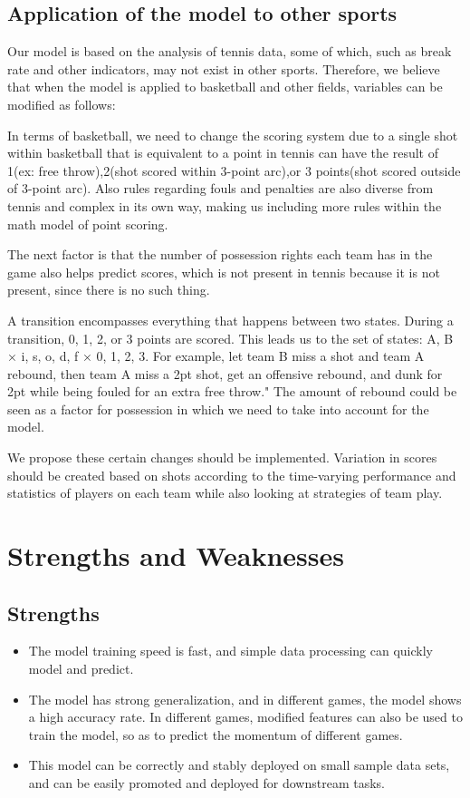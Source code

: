 \documentclass{mcmthesis}  %
\begin{document}
\subsection{Application of the model to other sports}  %
\hspace{1.5em}Our model is based on the analysis of tennis data, some of which, such as break rate and other indicators, may not exist in other sports. Therefore, we believe that when the model is applied to basketball and other fields, variables can be modified as follows:
\par In terms of basketball, we need to change the scoring system due to a single shot within basketball that is equivalent to a point in tennis can have the result of 1(ex: free throw),2(shot scored within 3-point arc),or 3 points(shot scored outside of 3-point arc). Also rules regarding fouls and penalties are also diverse from tennis and complex in its own way, making us including more rules within the math model of point scoring. 
\par The next factor is that the number of possession rights each team has in the game also helps predict scores, which is not present in tennis because it is not present, since there is no such thing.
\par A transition encompasses everything that happens between two states. During a transition, 0, 1, 2, or 3 points are scored. This leads us to the set of states: {A, B} × {i, s, o, d, f} × {0, 1, 2, 3}. For example, let team B miss a shot and team A rebound, then team A miss a 2pt shot, get an offensive rebound, and dunk for 2pt while being fouled for an extra free throw." The amount of rebound could be seen as a factor for possession in which we need to take into account for the model.
\par We propose these certain changes should be implemented. Variation in scores should be created based on shots according to the time-varying performance and statistics of players on each team while also looking at strategies of team play. \cite{1017285434.nh}

\section{Strengths and Weaknesses}  %
\subsection{Strengths}
\begin{itemize}
\item{The model training speed is fast, and simple data processing can quickly model and predict.}
\item{The model has strong generalization, and in different games, the model shows a high accuracy rate. In different games, modified features can also be used to train the model, so as to predict the momentum of different games.}
\item{This model can be correctly and stably deployed on small sample data sets, and can be easily promoted and deployed for downstream tasks.}
\end{itemize}
\end{document}
